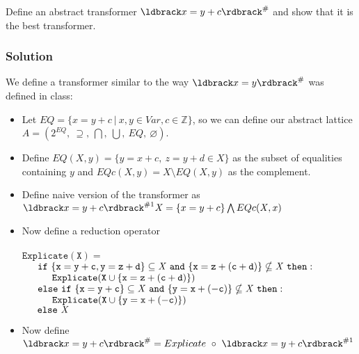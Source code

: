 Define an abstract transformer $\ldbrack x=y+c\rdbrack ^\#$ and show that it is the best transformer.

\subsubsection*{Solution}
We define a transformer similar to the way $\ldbrack x=y\rdbrack ^\#$ was defined in class:
\begin{itemize}
	\item Let $EQ=\{x=y+c\ |\ x,y\in Var,c\in \mathbb{Z}\}$, so we can define our abstract lattice 
	$A=(2^{EQ},\ \supseteq,\ \bigcap,\ \bigcup,\ EQ,\ \varnothing)$.
	\item Define $EQ(\mathit{X},y)=\{y=x+c,\ z=y+d \in \mathit{X}\}$ as the subset of equalities containing $y$ and
	$EQc(\mathit{X},y)=\mathit{X}\setminus EQ(\mathit{X},y)$ as the complement.
	\item Define naive version of the transformer as $\ldbrack x=y+c\rdbrack ^{\#1} \mathit{X}= \{x=y+c\}\bigwedge EQc(\mathit{X},x)$
	\item Now define a reduction operator \\ \\
	\setlength\parindent{0.5in}
	$\mathtt{Explicate(X)=}$\\
	$\indent \mathtt{if\ \{x=y+c,y=z+d\}\subseteq \mathit{X}\ and\ \{x=z+(c+d)\}\nsubseteq \mathit{X}\ then:}$\\
	$\indent \indent \mathtt{Explicate(X\cup \{x=z+(c+d)\})}$\\
	$\indent \mathtt{else\ if\ \{x=y+c\}\subseteq \mathit{X}\ and\ \{y=x+(-c)\}\nsubseteq \mathit{X}\ then:}$\\
	$\indent \indent \mathtt{Explicate(X\cup \{y=x+(-c)\})}$\\
	$\indent \mathtt{else\ \mathit{X}}$
	\setlength\parindent{0.0in}
	\item Now define $\ldbrack x=y+c\rdbrack ^\# =Explicate\ \circ \ \ldbrack x=y+c\rdbrack ^{\#1}$
\end{itemize}